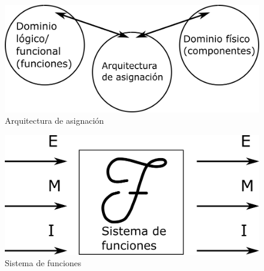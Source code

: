 \begin{figure}[h!]
    \centering
        \includegraphics[scale=0.30]{Proyecto Integrador Figuras/08 Arquitectura de asignacion.png}
        \caption{Arquitectura de asignación}
\end{figure}

\begin{figure}[h!]
    \centering
        \includegraphics[scale=0.30]{Proyecto Integrador Figuras/09 Sistema de funciones.png}
        \caption{Sistema de funciones}
\end{figure}